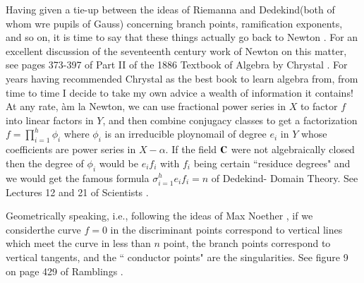 Having given a tie-up between the ideas of Riemanna and Dedekind\break (both of whom wre pupils of Gauss) concerning branch points, ramification exponents, and so on, it is time to say that these things actually go back to Newton \cite{chap1-key47}. For an excellent discussion of the seventeenth century work of Newton on this matter, see pages 373-397 of Part II of the 1886 Textbook of Algebra by Chrystal \cite{chap1-key27}. For years having recommended Chrystal as the best book to learn algebra from, from time to time I decide to take my own advice a wealth of information it contains! At any rate, \`am la Newton, we can use fractional power series in $X$ to factor $f$ into linear factors in $Y$, and then combine conjugacy classes to get a factorization $f= \prod^{h}_{i=1} \phi_{i}$ where $\phi_{i}$ is an irreducible ploynomail of degree $e_{i}$ in $Y$ whose coefficients are power series in $X-\alpha$. If the field $\mathbf{C}$ were not algebraically closed then the degree of $\phi_{i}$ would be $e_{i}f_{i}$ with $f_{i}$ being certain ``residuce degrees" and we would get the famous formula $\sigma^{h}_{i=1} e_{i}f_{i}=n$ of Dedekind- Domain Theory. See Lectures 12 and 21 of Scientists \cite{chap1-key6}.

Geometrically speaking, i.e., following the ideas of Max Noether \cite{chap1-key48}, if we consider\pageoriginale the curve $f=0$ in the discriminant points correspond to vertical lines which meet the curve in less than $n$ point, the branch points correspond to vertical tangents, and the `` conductor points" are the singularities. See figure 9 on page 429 of Ramblings \cite{chap1-key5}.

